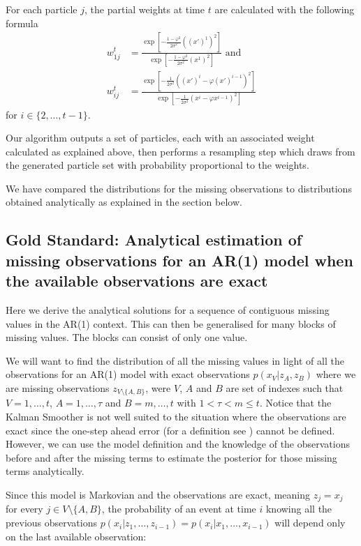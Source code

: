 For each particle $j$, the partial weights at time $t$ are calculated with the following formula
\begin{align} \label{eq:2}
    w_{1j}^t &= \frac{\exp \left[ -\frac{1 - \varphi^2}{2 \sigma^2}{((x')^1)^2} \right]}{\exp \left[ -\frac{1 - \varphi^2}{2 \sigma^2}{(x^1)^2} \right]} \mbox{ and } \\
    w_{ij}^t &= \frac{\exp \left[ -\frac{1}{2 \sigma^2}{((x')^i - \varphi (x')^{i-1})^2} \right]}{\exp \left[ -\frac{1}{2 \sigma^2}{(x^i - \varphi x^{i-1})^2} \right]}
\end{align}
for $i \in \{ 2, \ldots, t-1 \}$.

Our algorithm outputs a set of particles, each with an associated weight calculated as explained above, then performs a resampling step which draws from the generated particle set with probability proportional to the weights.

We have compared the distributions for the missing observations to distributions obtained analytically as explained in the section below.






\subsection{Gold Standard: Analytical estimation of missing observations for an AR(1) model when the available observations are exact}
\label{sec:6}

Here we derive the analytical solutions for a sequence of contiguous missing values in the AR(1) context. This can then be generalised for many blocks of missing values. The blocks can consist of only one value.

We will want to find the distribution of all the missing values in light of all the observations for an AR(1) model with exact observations $p(x_V | z_A, z_B)$ where we are missing observations $z_{V \setminus \{A,B\} }$, were $V$, $A$ and $B$ are set of indexes such that $V = 1, \dots, t$, $A = 1, \dots, \tau$ and $B = m, \dots, t$ with $1 < \tau < m \leq t$.
Notice that the Kalman Smoother is not well suited to the situation where the observations are exact since the one-step ahead error (for a definition see \cite{Young}) cannot be defined. However, we can use the model definition and the knowledge of the observations before and after the missing terms to estimate the posterior for those missing terms analytically.

Since this model is Markovian and the observations are exact, meaning $z_j = x_j$ for every $j \in V \setminus \{A,B\} $, the probability of an event at time $i$ knowing all the previous observations $p(x_i | z_1, \dots, z_{i-1}) = p(x_i | x_1, \dots, x_{i-1})$ will depend only on the last available observation:


